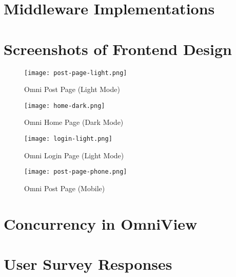 \appendix
\label{sec:appendix}

\chapter{Middleware Implementations}
\label{sec:apdx-middleware-implementations}





\chapter{Screenshots of Frontend Design}
\label{sec:apdx-screenshots}

\begin{figure}[htbp]
\texttt{[image: post-page-light.png]}
\centering
\caption{Omni Post Page (Light Mode)}
\end{figure}

\begin{figure}[t]
\texttt{[image: home-dark.png]}
\centering
\caption{Omni Home Page (Dark Mode)}
\end{figure}

\begin{figure}[b]
\texttt{[image: login-light.png]}
\centering
\caption{Omni Login Page (Light Mode)}
\end{figure}

\begin{figure}[htbp]
\texttt{[image: post-page-phone.png]}
\centering
\caption{Omni Post Page (Mobile)}
\end{figure}

\chapter{Concurrency in OmniView}
\label{sec:apdx-concurrency-omni-view}



\chapter{User Survey Responses}
\label{sec:apdx-user-survey}

